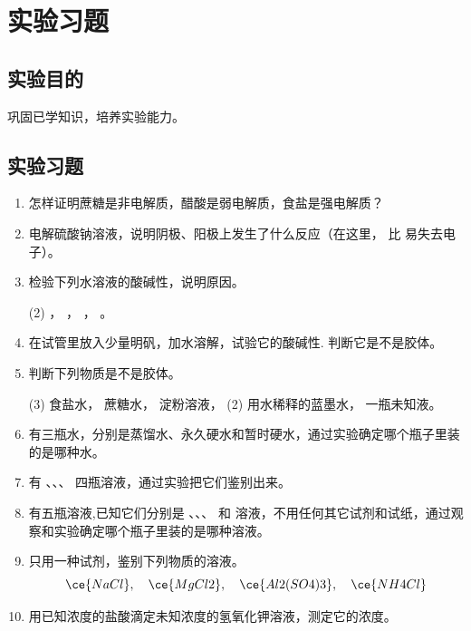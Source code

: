 \section{实验习题}
\subsection*{实验目的}
巩固已学知识，培养实验能力。

\subsection*{实验习题}
\begin{enumerate}[1.]
  \item 怎样证明蔗糖是非电解质，醋酸是弱电解质，食盐是强电解质？
  \item 电解硫酸钠溶液，说明阴极、阳极上发生了什么反应（在这里， 比  易失去电子）。
  \item 检验下列水溶液的酸碱性，说明原因。
  \begin{tasks}[item-indent=5em,label=\Alph*.,label-width=15pt](2)
    \task {}，
    \task {}，
    \task {}，
    \task {}。
  \end{tasks}
  \item 在试管里放入少量明矾，加水溶解，试验它的酸碱性. 判断它是不是胶体。
  \item 判断下列物质是不是胶体。
  \begin{tasks}[item-indent=5em,label=\Alph*.,label-width=15pt](3)
    \task 食盐水，
    \task 蔗糖水，
    \task 淀粉溶液，
    \task*(2) 用水稀释的蓝墨水，
    \task 一瓶未知液。
  \end{tasks}
  \item 有三瓶水，分别是蒸馏水、永久硬水和暂时硬水，通过实验确定哪个瓶子里装的是哪种水。
  \item 有 、、、 四瓶溶液，通过实验把它们鉴别出来。
  \item 有五瓶溶液,已知它们分别是 、、、 和  溶液，不用任何其它试剂和试纸，通过观察和实验确定哪个瓶子里装的是哪种溶液。
  \item 只用一种试剂，鉴别下列物质的溶液。
  \[\ce{NaCl},\quad\ce{MgCl2},\quad\ce{Al2(SO4)3},\quad\ce{NH4Cl}\]
  \item 用已知浓度的盐酸滴定未知浓度的氢氧化钾溶液，测定它的浓度。
\end{enumerate}